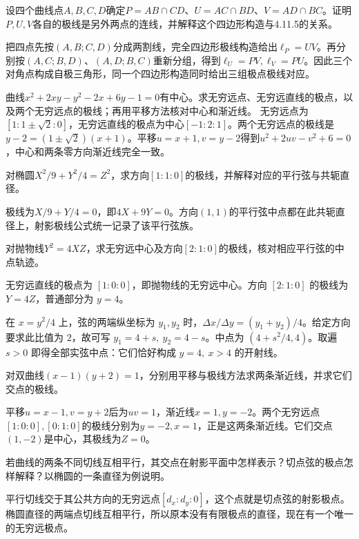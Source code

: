 设四个曲线点\(A,B,C,D\)确定\(P=AB\cap CD\)、\(U=AC\cap BD\)、\(V=AD\cap BC\)。证明\(P,U,V\)各自的极线是另外两点的连线，并解释这个四边形构造与4.11.5的关系。
\par
\solutionanswer
把四点先按\((A,B;C,D)\)分成两割线，完全四边形极线构造给出\(\ell_P=UV\)。再分别按\((A,C;B,D)\)、\((A,D;B,C)\)重新分组，得到\(\ell_U=PV,\ell_V=PU\)。因此三个对角点构成自极三角形，同一个四边形构造同时给出三组极点极线对应。


曲线\(x^2+2xy-y^2-2x+6y-1=0\)有中心。求无穷远点、无穷远直线的极点，以及两个无穷远点的极线；再用平移方法核对中心和渐近线。
\solutionanswer
无穷远点为\([1:1\pm\sqrt2:0]\)，无穷远直线的极点为中心\([-1:2:1]\)。两个无穷远点的极线是\(y-2=(1\pm\sqrt2)(x+1)\)。平移\(u=x+1,v=y-2\)得到\(u^2+2uv-v^2+6=0\)，中心和两条零方向渐近线完全一致。


对椭圆\(X^2/9+Y^2/4=Z^2\)，求方向\([1:1:0]\)的极线，并解释对应的平行弦与共轭直径。
\par
\solutionanswer
极线为\(X/9+Y/4=0\)，即\(4X+9Y=0\)。方向\((1,1)\)的平行弦中点都在此共轭直径上，射影极线公式统一记录了该平行弦族。


对抛物线\(Y^2=4XZ\)，求无穷远中心及方向\([2:1:0]\)的极线，核对相应平行弦的中点轨迹。
\par
\solutionanswer
无穷远直线的极点为 \([1:0:0]\)，即抛物线的无穷远中心。方向 \([2:1:0]\) 的极线为 \(Y=4Z\)，普通部分为 \(y=4\)。

在 \(x=y^2/4\) 上，弦的两端纵坐标为 \(y_1,y_2\) 时，\(\Delta x/\Delta y=(y_1+y_2)/4\)。给定方向要求此比值为 \(2\)，故可写 \(y_1=4+s,\ y_2=4-s\)。中点为 \((4+s^2/4,4)\)。取遍 \(s>0\) 即得全部实弦中点：它们恰好构成 \(y=4,\ x>4\) 的开射线。


对双曲线\((x-1)(y+2)=1\)，分别用平移与极线方法求两条渐近线，并求它们交点的极线。
\par
\solutionanswer
平移\(u=x-1,v=y+2\)后为\(uv=1\)，渐近线\(x=1,y=-2\)。两个无穷远点\([1:0:0],[0:1:0]\)的极线分别为\(y=-2,x=1\)，正是这两条渐近线。它们交点\((1,-2)\)是中心，其极线为\(Z=0\)。


若曲线的两条不同切线互相平行，其交点在射影平面中怎样表示？切点弦的极点怎样解释？以椭圆的一条直径为例说明。
\par
\solutionanswer
平行切线交于其公共方向的无穷远点\([d_x:d_y:0]\)，这个点就是切点弦的射影极点。椭圆直径的两端点切线互相平行，所以原本没有有限极点的直径，现在有一个唯一的无穷远极点。


